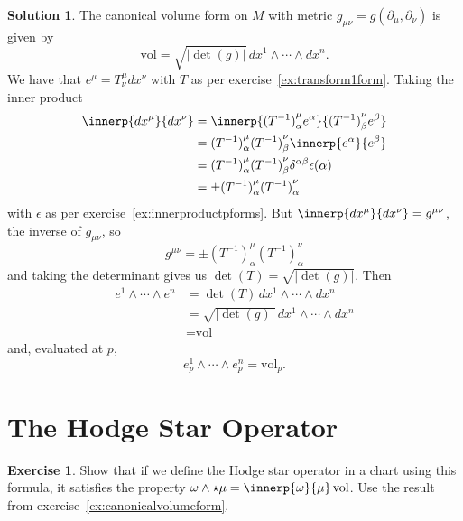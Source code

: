 \documentclass[11pt, a4paper]{report}
\theoremstyle{definition}
\newtheorem{ex}{Exercise}[part]
\newtheorem{sol}{Solution}[part]
\begin{document}
\begin{sol}

The canonical volume form on $M$ with metric $g_{\mu\nu} = g(\partial_\mu, \partial_\nu)$ is given by
\[
    \text{vol} = \sqrt{|\det(g)|} \, dx^1 \wedge \cdots \wedge dx^n.
\]
We have that $e^\mu = T^\mu_\nu dx^\nu$ with $T$ as per exercise~\ref{ex:transform1form}. Taking the inner product
\begin{align*}
    \innerp{dx^\mu}{dx^\nu} &= \innerp{{(T^{-1})}^\mu_\alpha e^\alpha}{{(T^{-1})}^\nu_\beta e^\beta} \\
        &= {(T^{-1})}^\mu_\alpha {(T^{-1})}^\nu_\beta \innerp{e^\alpha}{e^\beta} \\
        &= {(T^{-1})}^\mu_\alpha {(T^{-1})}^\nu_\beta \delta^{\alpha\beta} \epsilon(\alpha) \\
        &= \pm {(T^{-1})}^\mu_\alpha {(T^{-1})}^\nu_\alpha
\end{align*}
with $\epsilon$ as per exercise~\ref{ex:innerproductpforms}.
But $\innerp{dx^\mu}{dx^\nu} = g^{\mu\nu}$, the inverse of $g_{\mu\nu}$, so
\[
g^{\mu\nu} = \pm {(T^{-1})}^\mu_\alpha {(T^{-1})}^\nu_\alpha
\]
and taking the determinant gives us $\det(T) = \sqrt{|\det(g)|}$. Then
\begin{align*}
    e^1 \wedge \cdots \wedge e^n &= \det(T) \, dx^1 \wedge \cdots \wedge dx^n \\
        &= \sqrt{|\det(g)|} \, dx^1 \wedge \cdots \wedge dx^n \\
        &= \text{vol}
\end{align*}
and, evaluated at $p$,
\[
e_p^1 \wedge \cdots \wedge e_p^n = \text{vol}_p.
\]

\end{sol}

\section{The Hodge Star Operator}

\begin{ex}

Show that if we define the Hodge star operator in a chart using this formula, it satisfies the property $\omega \wedge \star \mu = \innerp{\omega}{\mu} \, \text{vol}$. Use the result from exercise~\ref{ex:canonicalvolumeform}.

\end{ex}
\end{document}
